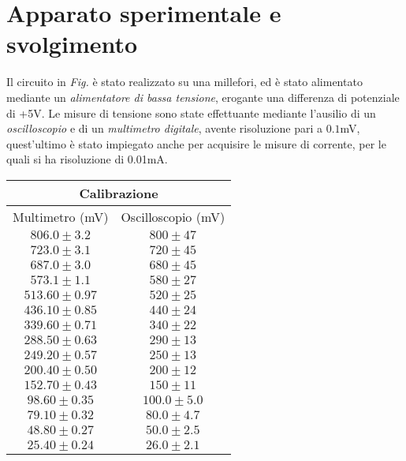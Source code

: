 \documentclass[@SRC@/main]{subfiles}
\begin{document}
\section{Apparato sperimentale e svolgimento} \label{sec:acquisizione}
  Il circuito in \textit{Fig.\!\!} è stato realizzato su una millefori, ed è stato alimentato mediante un \textit{alimentatore di bassa tensione}, erogante una differenza di potenziale di +5V. 
  Le misure di tensione sono state effettuante mediante l'ausilio di un \textit{oscilloscopio} e di un \textit{multimetro digitale}, avente risoluzione pari a $0.1$mV, quest'ultimo è stato impiegato anche per acquisire le misure di corrente, per le quali si ha risoluzione di 0.01mA.
  

  \begin{center}
    \begin{tabular}{ ||c|c|| }
        \hline
        \multicolumn{2}{||c||}{Calibrazione}\\
        \hline
        Multimetro (mV) & Oscilloscopio (mV) \\
        \hline
        $806.0\pm 3.2$ & $800\pm 47$ \\
        \hline
        $723.0\pm 3.1$ & $720\pm 45$ \\
        \hline
        $687.0\pm 3.0$ & $680\pm 45$ \\
        \hline
        $573.1\pm 1.1$ & $580\pm 27$ \\
        \hline
        $513.60\pm 0.97$ & $520\pm 25$ \\
        \hline
        $436.10\pm 0.85$ & $440\pm 24$ \\
        \hline
        $339.60\pm 0.71$ & $340\pm 22$ \\
        \hline
        $288.50\pm 0.63$ & $290\pm 13$ \\
        \hline
        $249.20\pm 0.57$ & $250\pm 13$ \\
        \hline
        $200.40\pm 0.50$ & $200\pm 12$ \\
        \hline
        $152.70\pm 0.43$ & $150\pm 11$ \\
        \hline 
        $98.60\pm 0.35$ & $100.0\pm 5.0$ \\
        \hline 
        $79.10\pm 0.32$ & $80.0\pm 4.7$ \\
        \hline 
        $48.80\pm 0.27$ & $50.0\pm 2.5$ \\
        \hline 
        $25.40\pm 0.24$ & $26.0\pm 2.1$ \\
        \hline 
        
        
    \end{tabular}   
\end{center}
\end{document}
